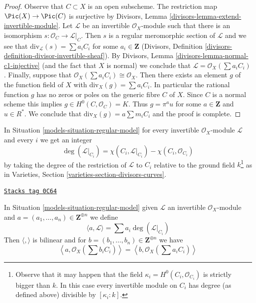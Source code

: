 \begin{proof}
Observe that $C \subset X$ is an open subscheme. The restriction
map $\Pic(X) \to \Pic(C)$ is surjective by
Divisors, Lemma \ref{divisors-lemma-extend-invertible-module}.
Let $\mathcal{L}$ be an invertible $\mathcal{O}_X$-module
such that there is an isomorphism $s : \mathcal{O}_C \to \mathcal{L}|_C$.
Then $s$ is a regular meromorphic section of $\mathcal{L}$
and we see that $\text{div}_\mathcal{L}(s) = \sum a_i C_i$
for some $a_i \in \mathbf{Z}$
(Divisors, Definition \ref{divisors-definition-divisor-invertible-sheaf}).
By Divisors, Lemma \ref{divisors-lemma-normal-c1-injective}
(and the fact that $X$ is normal)
we conclude that $\mathcal{L} = \mathcal{O}_X(\sum a_iC_i)$.
Finally, suppose that $\mathcal{O}_X(\sum a_i C_i) \cong \mathcal{O}_X$.
Then there exists an element $g$ of the function field of $X$
with $\text{div}_X(g) = \sum a_i C_i$. In particular the rational
function $g$ has no zeros or poles on the generic fibre $C$ of $X$.
Since $C$ is a normal scheme this implies $g \in H^0(C, \mathcal{O}_C) = K$.
Thus $g = \pi^a u$ for some $a \in \mathbf{Z}$ and $u \in R^*$.
We conclude that $\text{div}_X(g) = a \sum m_i C_i$ and the proof
is complete.
\end{proof}

In Situation \ref{models-situation-regular-model} for every invertible
$\mathcal{O}_X$-module $\mathcal{L}$ and every $i$ we get an integer
$$
\deg(\mathcal{L}|_{C_i}) =
\chi(C_i, \mathcal{L}|_{C_i}) - \chi(C_i, \mathcal{O}_{C_i})
$$
by taking the degree of the restriction of $\mathcal{L}$ to $C_i$
relative to the ground field $k$\footnote{Observe that it may happen
that the field $\kappa_i = H^0(C_i, \mathcal{O}_{C_i})$ is strictly bigger
than $k$. In this case every invertible module on $C_i$ has
degree (as defined above) divisible by $[\kappa_i : k]$.}
as in Varieties, Section \ref{varieties-section-divisors-curves}.

\begin{lemma}
\label{models-lemma-intersection-pairing}
\href{https://stacks.math.columbia.edu/tag/0C64}{\texttt{Stacks tag 0C64}}

In Situation \ref{models-situation-regular-model} given $\mathcal{L}$ an invertible
$\mathcal{O}_X$-module and
$a = (a_1, \ldots, a_n) \in \mathbf{Z}^{\oplus n}$ we define
$$
\langle a, \mathcal{L} \rangle = \sum a_i\deg(\mathcal{L}|_{C_i})
$$
Then $\langle , \rangle$ is bilinear and for
$b = (b_1, \ldots, b_n) \in \mathbf{Z}^{\oplus n}$ we have
$$
\left\langle a, \mathcal{O}_X(\sum b_i C_i) \right\rangle =
\left\langle b, \mathcal{O}_X(\sum a_i C_i) \right\rangle
$$
\end{lemma}

